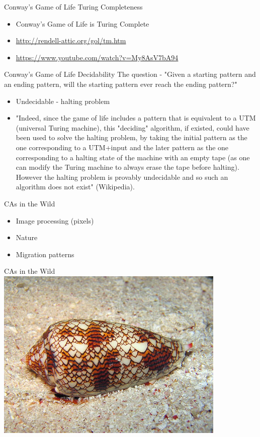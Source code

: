 \documentclass[bigger]{beamer}
\begin{document}
\begin{frame}[label=sec-21]{Conway's Game of Life Turing Completeness}
\begin{itemize}
\item Conway's Game of Life is Turing Complete
\item \url{http://rendell-attic.org/gol/tm.htm}
\item \url{https://www.youtube.com/watch?v=My8AsV7bA94}
\end{itemize}
\end{frame}
\begin{frame}[label=sec-22]{Conway's Game of Life Decidability}
The question - "Given a starting pattern and an ending pattern, will the starting pattern ever reach the ending pattern?"
\begin{itemize}
\item<2->Undecidable - halting problem
\item<3->"Indeed, since the game of life includes a pattern that is equivalent to a UTM (universal Turing machine), this "deciding" algorithm, if existed, could have been used to solve the halting problem, by taking the initial pattern as the one corresponding to a UTM+input and the later pattern as the one corresponding to a halting state of the machine with an empty tape (as one can modify the Turing machine to always erase the tape before halting). However the halting problem is provably undecidable and so such an algorithm does not exist" (Wikipedia).
\end{itemize}
\end{frame}
\begin{frame}[label=sec-23]{CAs in the Wild}
\begin{itemize}
\item<1->Image processing (pixels)
\item<2->Nature
\item<3->Migration patterns
\end{itemize}
\end{frame}
\begin{frame}[label=sec-24]{CAs in the Wild}
\includegraphics[width=11cm]{images/shell.jpg}
\end{frame}
\end{document}

